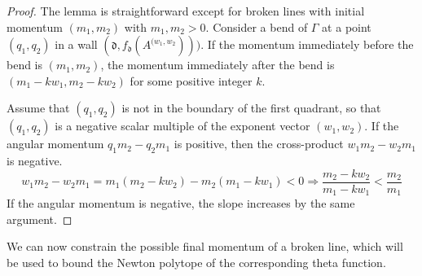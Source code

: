 \documentclass[11pt]{amsart}
\theoremstyle{remark}
\numberwithin{equation}{section}
\newcommand{\fd}{\mathfrak{d}}
\begin{document}
\begin{proof}
The lemma is straightforward except for broken lines with initial momentum $(m_1,m_2)$ with $m_1,m_2>0$.  
Consider a bend of $\Gamma$ at a point $(q_1,q_2)$ in a wall $(\fd,f_{\fd}(A^{(w_1,w_2})))$.  If the momentum immediately before the bend is $(m_1,m_2)$, the momentum immediately after the bend is $(m_1-kw_1,m_2-kw_2)$ for some positive integer $k$.  

Assume that $(q_1,q_2)$ is not in the boundary of the first quadrant, so that $(q_1,q_2)$ is a negative scalar multiple of the exponent vector $(w_1,w_2)$. If the angular momentum $q_1m_2-q_2m_1$ is positive, then the cross-product $w_1m_2-w_2m_1$ is negative. 
\[ w_1m_2-w_2m_1=m_1(m_2-kw_2)-m_2(m_1-kw_1)<0 \Rightarrow \frac{m_2-kw_2}{m_1-kw_1} < \frac{m_2}{m_1}\]
If the angular momentum is negative, the slope increases by the same argument.
\end{proof}

We can now constrain the possible final momentum of a broken line, which will be used to bound the Newton polytope of the corresponding theta function.
\end{document}
